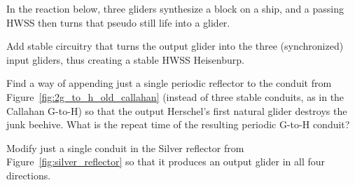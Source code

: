 \begin{multicols}{2}
	\mfilbreak
	
	
	\begin{problem}\label{exer:create_hwss_heisenburp} 
		In the reaction below, three gliders synthesize a block on a ship, and a passing HWSS then turns that pseudo still life into a glider.
		
		\begin{center}
		\end{center}
	
		\noindent Add stable circuitry that turns the output glider into the three (synchronized) input gliders, thus creating a stable HWSS Heisenburp.
	\end{problem}
	
	
	\mfilbreak
	
	
	\begin{problem}\label{exer:callahan_g_to_h_faster_periodic} 
		Find a way of appending just a single periodic reflector to the conduit from Figure~\ref{fig:2g_to_h_old_callahan} (instead of three stable conduits, as in the Callahan G-to-H) so that the output Herschel's first natural glider destroys the junk beehive. What is the repeat time of the resulting periodic G-to-H conduit?
	\end{problem}
	
	
	\mfilbreak
	
	
	\begin{problemstar}\label{exer:four_dir_silver_reflector} 
		Modify just a single conduit in the Silver reflector from Figure~\ref{fig:silver_reflector} so that it produces an output glider in all four directions.
	\end{problemstar}
	
	
\end{multicols}
\normalsize\vspace*{0.01cm}\ifdefined\FORPRINTING{}\else%
\fi

